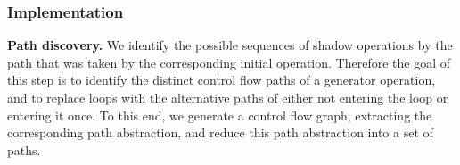 \fi

\subsubsection{Implementation}

{\bf Path discovery.}
We identify the possible sequences of shadow operations by the path
that was taken by the corresponding initial operation. Therefore
the goal of this step is to identify the distinct control flow paths of
a generator operation, and to replace loops with the alternative paths
of either not entering the loop or entering it once. To this end, we
generate a control flow graph, extracting the corresponding path abstraction, and
reduce this path abstraction into a set of paths.



